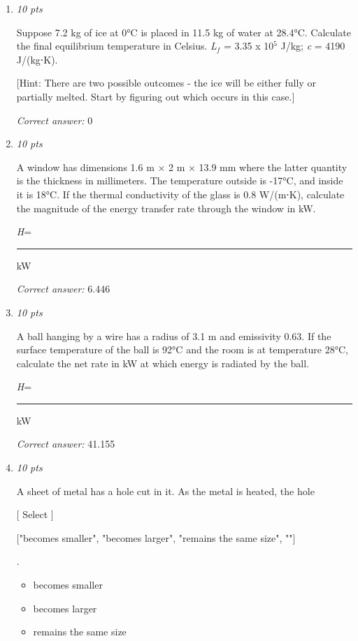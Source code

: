 \documentclass[11pt]{article}
\begin{document}
\begin{enumerate}[leftmargin=*,label=\textbf{Question \arabic*.}]
[Use: \emph{c}$_{ice}$ = 2100 J/(kg⋅K); \emph{c}$_{water}$ = 4190 J/(kg⋅K); \emph{L}$_{f,water}$ = 334x10$^{3}$ J/kg]

\textit{Correct answer:} 1,191.7776

\item \hfill \textit{10 pts}

Suppose 7.2 kg of ice at 0°C is placed in 11.5 kg of water at 28.4°C. Calculate the final equilibrium temperature in Celsius. \emph{L}$_{f}$ = 3.35 x 10$^{5}$ J/kg; \emph{c} = 4190 J/(kg⋅K).

[Hint: There are two possible outcomes - the ice will be either fully or partially melted. Start by figuring out which occurs in this case.]

\textit{Correct answer:} 0

\item \hfill \textit{10 pts}

A window has dimensions 1.6 m × 2 m × 13.9 mm where the latter quantity is the thickness in millimeters. The temperature outside is -17°C, and inside it is 18°C. If the thermal conductivity of the glass is 0.8  W/(m⋅K), calculate the magnitude of the energy transfer rate through the window in kW.



\emph{H}= \rule{2.5cm}{0.4pt} kW

\textit{Correct answer:} 6.446

\item \hfill \textit{10 pts}

A ball hanging by a wire has a radius of 3.1 m and emissivity 0.63. If the surface temperature of the ball is 92°C and the room is at temperature 28°C, calculate the net rate in kW at which energy is radiated by the ball.



\emph{H}= \rule{2.5cm}{0.4pt} kW

\textit{Correct answer:} 41.155

\item \hfill \textit{10 pts}

A sheet of metal has a hole cut in it. As the metal is heated, the hole

    [ Select ]

  ["becomes smaller", "becomes larger", "remains the same size", ""]

 .

\begin{itemize}
  \item becomes smaller
  \item becomes larger
  \item remains the same size
\end{itemize}


\end{enumerate}
\end{document}
